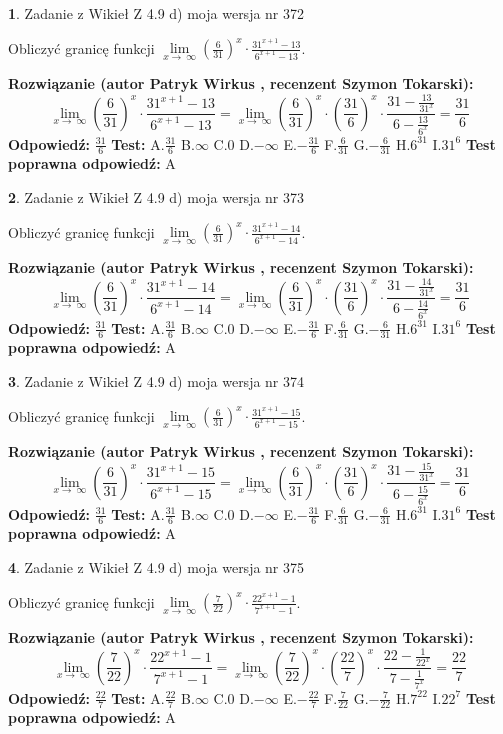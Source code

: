\documentclass[12pt, a4paper]{article}
\theoremstyle{definition} %
\newtheorem{zad}{}
\newcommand{\zadStart}[1]{\begin{zad}#1\newline}
\newcommand{\zadStop}{\end{zad}}
\newcommand{\rozwStart}[2]{\noindent \textbf{Rozwiązanie (autor #1 , recenzent #2): }\newline}
\newcommand{\rozwStop}{\newline}
\newcommand{\odpStart}{\noindent \textbf{Odpowiedź:}\newline}
\newcommand{\odpStop}{\newline}
\newcommand{\testStart}{\noindent \textbf{Test:}\newline}
\newcommand{\testStop}{\newline}
\newcommand{\kluczStart}{\noindent \textbf{Test poprawna odpowiedź:}\newline}
\newcommand{\kluczStop}{\newline}
\begin{document}
\zadStart{Zadanie z Wikieł Z 4.9 d) moja wersja nr 372}


Obliczyć granicę funkcji  $\lim\limits_{x\to\ \infty}(\frac{6}{31})^{x}\cdot\frac{31^{x+1}-13}{6^{x+1}-13}$.
\zadStop
\rozwStart{Patryk Wirkus}{Szymon Tokarski}
$$\lim\limits_{x\to\ \infty}(\frac{6}{31})^{x}\cdot\frac{31^{x+1}-13}{6^{x+1}-13}=\lim\limits_{x\to\ \infty}(\frac{6}{31})^{x}\cdot(\frac{31}{6})^{x} \cdot \frac{31-\frac{13}{31^{x}}}{6-\frac{13}{6^{x}}} = \frac{31}{6}$$
\rozwStop
\odpStart
$\frac{31}{6}$
\odpStop
\testStart
A.$\frac{31}{6}$ B.$\infty$ C.$0$ D.$-\infty$ E.$-\frac{31}{6}$
F.$\frac{6}{31}$ G.$-\frac{6}{31}$
H.$6^{31}$
I.$31^{6}$
\testStop
\kluczStart
A
\kluczStop



\zadStart{Zadanie z Wikieł Z 4.9 d) moja wersja nr 373}


Obliczyć granicę funkcji  $\lim\limits_{x\to\ \infty}(\frac{6}{31})^{x}\cdot\frac{31^{x+1}-14}{6^{x+1}-14}$.
\zadStop
\rozwStart{Patryk Wirkus}{Szymon Tokarski}
$$\lim\limits_{x\to\ \infty}(\frac{6}{31})^{x}\cdot\frac{31^{x+1}-14}{6^{x+1}-14}=\lim\limits_{x\to\ \infty}(\frac{6}{31})^{x}\cdot(\frac{31}{6})^{x} \cdot \frac{31-\frac{14}{31^{x}}}{6-\frac{14}{6^{x}}} = \frac{31}{6}$$
\rozwStop
\odpStart
$\frac{31}{6}$
\odpStop
\testStart
A.$\frac{31}{6}$ B.$\infty$ C.$0$ D.$-\infty$ E.$-\frac{31}{6}$
F.$\frac{6}{31}$ G.$-\frac{6}{31}$
H.$6^{31}$
I.$31^{6}$
\testStop
\kluczStart
A
\kluczStop



\zadStart{Zadanie z Wikieł Z 4.9 d) moja wersja nr 374}


Obliczyć granicę funkcji  $\lim\limits_{x\to\ \infty}(\frac{6}{31})^{x}\cdot\frac{31^{x+1}-15}{6^{x+1}-15}$.
\zadStop
\rozwStart{Patryk Wirkus}{Szymon Tokarski}
$$\lim\limits_{x\to\ \infty}(\frac{6}{31})^{x}\cdot\frac{31^{x+1}-15}{6^{x+1}-15}=\lim\limits_{x\to\ \infty}(\frac{6}{31})^{x}\cdot(\frac{31}{6})^{x} \cdot \frac{31-\frac{15}{31^{x}}}{6-\frac{15}{6^{x}}} = \frac{31}{6}$$
\rozwStop
\odpStart
$\frac{31}{6}$
\odpStop
\testStart
A.$\frac{31}{6}$ B.$\infty$ C.$0$ D.$-\infty$ E.$-\frac{31}{6}$
F.$\frac{6}{31}$ G.$-\frac{6}{31}$
H.$6^{31}$
I.$31^{6}$
\testStop
\kluczStart
A
\kluczStop



\zadStart{Zadanie z Wikieł Z 4.9 d) moja wersja nr 375}


Obliczyć granicę funkcji  $\lim\limits_{x\to\ \infty}(\frac{7}{22})^{x}\cdot\frac{22^{x+1}-1}{7^{x+1}-1}$.
\zadStop
\rozwStart{Patryk Wirkus}{Szymon Tokarski}
$$\lim\limits_{x\to\ \infty}(\frac{7}{22})^{x}\cdot\frac{22^{x+1}-1}{7^{x+1}-1}=\lim\limits_{x\to\ \infty}(\frac{7}{22})^{x}\cdot(\frac{22}{7})^{x} \cdot \frac{22-\frac{1}{22^{x}}}{7-\frac{1}{7^{x}}} = \frac{22}{7}$$
\rozwStop
\odpStart
$\frac{22}{7}$
\odpStop
\testStart
A.$\frac{22}{7}$ B.$\infty$ C.$0$ D.$-\infty$ E.$-\frac{22}{7}$
F.$\frac{7}{22}$ G.$-\frac{7}{22}$
H.$7^{22}$
I.$22^{7}$
\testStop
\kluczStart
A
\kluczStop
\end{document}
